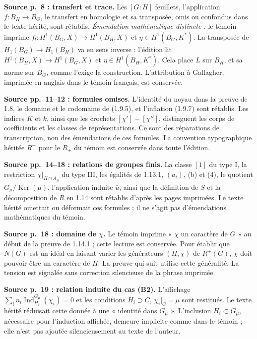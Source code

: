 \documentclass[10pt,letterpaper]{article}
\newcommand{\Ind}{\operatorname{Ind}}
\providecommand{\Ker}{\operatorname{Ker}}
\providecommand{\Ind}{\operatorname{Ind}}
\providecommand{\Ker}{\operatorname{Ker}}
\begin{document}
\begin{description}[style=nextline,leftmargin=2.6em,labelwidth=2.2em,font=\normalfont\bfseries]
\item[E25] \textbf{Source p.~8 : transfert et trace.} Les \([G:H]\) feuillets, l'application \(f:B_H\to B_G\), le transfert en homologie et sa transposée, omis ou confondus dans le texte hérité, sont rétablis. \textit{Émendation mathématique distincte :} le témoin imprime \(f_!:H^1(B_G,X)\to H^1(B_H,X)\) et \(\eta\in H^1(B_G,K^*)\). La transposée de \(H_1(B_G)\to H_1(B_H)\) va en sens inverse : l'édition lit \(H^1(B_H,X)\to H^1(B_G,X)\) et \(\eta\in H^1(B_H,K^*)\). Cela place \(L\) sur \(B_H\), et sa norme sur \(B_G\), comme l'exige la construction. L'attribution à Gallagher, imprimée en anglais dans le témoin français, est conservée.
\item[E26] \textbf{Source pp.~11--12 : formules omises.} L'identité du noyau dans la preuve de 1.8, le domaine et le codomaine de (1.9.5), et l'inflation (1.9.7) sont rétablis. Les indices \(K\) et \(k\), ainsi que les crochets \([\chi']-[\chi'']\), distinguent les corps de coefficients et les classes de représentations. Ce sont des réparations de transcription, non des émendations de ces formules. La convention typographique héritée \(R^+\) pour le \(R_+\) du témoin est conservée dans toute l'édition.
\item[E27] \textbf{Source pp.~14--18 : relations de groupes finis.} La classe \([1]\) du type I, la restriction \(\chi|_{H\cap A_\mu}\) du type III, les égalités de 1.13.1, \((a_i)\), (b) et (4), le quotient \(G_\mu/\Ker(\mu)\), l'application induite \(\bar u\), ainsi que la définition de \(S\) et la décomposition de \(R\) en 1.14 sont rétablis d'après les pages imprimées. Le texte hérité omettait ou déformait ces formules ; il ne s'agit pas d'émendations mathématiques du témoin.
\item[E28] \textbf{Source p.~18 : domaine de \(\chi\).} Le témoin imprime « \(\chi\) un caractère de \(G\) » au début de la preuve de 1.14.1 ; cette lecture est conservée. Pour établir que \(N(G)\) est un idéal en faisant varier les générateurs \((H,\chi)\) de \(R^+(G)\), \(\chi\) doit pouvoir être un caractère de \(H\). La preuve qui suit utilise cette généralité. La tension est signalée sans correction silencieuse de la phrase imprimée.
\item[E29] \textbf{Source p.~19 : relation induite du cas (B2).} L'affichage \(\sum_i n_i\Ind_{H_i}^{G_\mu}(\chi_i)=0\) et les conditions \(H_i\supset C\), \(\chi_i|_C=\mu\) sont restitués. Le texte hérité réduisait cette donnée à une « identité dans \(G_\mu\) ». L'inclusion \(H_i\subset G_\mu\), nécessaire pour l'induction affichée, demeure implicite comme dans le témoin ; elle n'est pas ajoutée silencieusement au texte de l'auteur.

\end{description}
\end{document}
